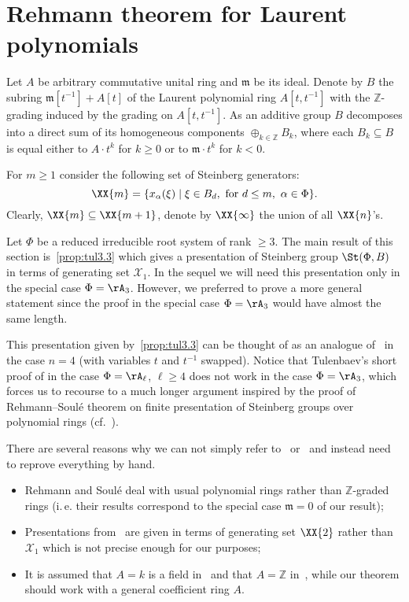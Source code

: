 \section{Rehmann theorem for Laurent polynomials}
Let $A$ be arbitrary commutative unital ring and $\mathfrak{m}$ be its ideal.
Denote by $B$ the subring $\mathfrak{m}[t^{-1}] + A[t]$ of the Laurent polynomial ring $A[t, t^{-1}]$ with the $\mathbb{Z}$-grading induced by the grading on $A[t, t^{-1}]$.
As an additive group $B$ decomposes into a direct sum of its homogeneous components $\oplus_{k\in\mathbb{Z}} B_k$,
 where each $B_k \subseteq B$ is equal either to $A\cdot t^k$ for $k \geq 0$ or to $\mathfrak{m} \cdot t^k$ for $k<0$.
  
For $m \geq 1$ consider the following set of Steinberg generators:
\[\XX{m} = \{ x_{\alpha}(\xi) \mid \xi \in B_d,\text{ for } d\leq m,\ \alpha\in\Phi\}. \]
Clearly, $\XX{m} \subseteq \XX{m+1}$, denote by $\XX{\infty}$ the union of all $\XX{n}$'s.

Let $\Phi$ be a reduced irreducible root system of rank $\geq 3$.
The main result of this section is~\cref{prop:tul3.3} which gives a presentation of Steinberg group $\St(\Phi, B)$ in terms of generating set $\mathcal{X}_1$.
In the sequel we will need this presentation only in the special case $\Phi=\rA_3$. However, we preferred to prove a more general statement since the proof in the special case $\Phi=\rA_3$ would have almost the same length.

This presentation given by~\cref{prop:tul3.3} can be thought of as an analogue of~\cite[Lemma~3.3]{Tu83} in the case $n=4$ (with variables $t$ and $t^{-1}$ swapped).
Notice that Tulenbaev's short proof of \cite[Lemma~3.3]{Tu83} in the case $\Phi=\rA_\ell$, $\ell\geq 4$ does not work in the case $\Phi=\rA_3$, which forces us to recourse to a much longer argument inspired by the proof of Rehmann--Soul{\'e} theorem on finite presentation of Steinberg groups over polynomial rings (cf.~\cite{Re75, RS76}).
 
\begin{rem}
There are several reasons why we can not simply refer to~\cite{Re75} or~\cite{RS76} and instead need to reprove everything by hand.
\begin{itemize}
 \item Rehmann and Soul{\'e} deal with usual polynomial rings rather than $\mathbb{Z}$-graded rings
  (i.\,e. their results correspond to the special case $\mathfrak{m}=0$ of our result);
 \item Presentations from~\cite{Re75,RS76} are given in terms of generating set $\XX{2}$ rather than $\mathcal{X}_1$ which is not precise enough for our purposes;
 \item It is assumed that $A=k$ is a field in~\cite{Re75} and that $A=\mathbb{Z}$ in~\cite{RS76}, while our theorem should work with a general coefficient ring $A$.
\end{itemize} 
\end{rem}

